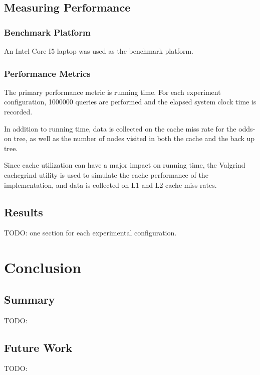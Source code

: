 \documentclass[mcs]{scsthesis}
\begin{document}
\section{Measuring Performance}

\subsection{Benchmark Platform}

An Intel Core I5 laptop was used as the benchmark platform.

\subsection{Performance Metrics}

The primary performance metric is running time.  For each experiment
configuration, 1000000 queries are performed and the elapsed system clock
time is recorded.

In addition to running time, data is collected on the cache miss rate for the
odds-on tree, as well as the number of nodes visited in both the cache and the
back up tree.

Since cache utilization can have a major impact on running time, the Valgrind
\cite{valgrind} cachegrind utility is used to simulate the cache performance
of the implementation, and data is collected on L1 and L2 cache miss rates.

\section{Results}

TODO: one section for each experimental configuration.

\chapter{Conclusion}

\section{Summary}

TODO:

\section{Future Work}

TODO:
\end{document}
